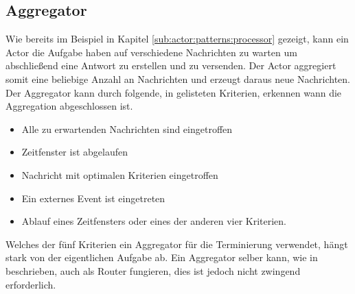\subsection{Aggregator}\label{sec:actor:patterns:aggregator}
Wie bereits im Beispiel in Kapitel \ref{sub:actor:patterns:processor} gezeigt, kann ein Actor die Aufgabe haben auf verschiedene Nachrichten zu warten um abschließend eine Antwort zu erstellen und zu versenden. Der Actor aggregiert somit eine beliebige Anzahl an Nachrichten und erzeugt daraus neue Nachrichten. \\
Der Aggregator kann durch folgende, in \cite{Vernon2015ReactiveAkka} gelisteten Kriterien, erkennen wann die Aggregation abgeschlossen ist.
\begin{itemize}
  \item Alle zu erwartenden Nachrichten sind eingetroffen
  \item Zeitfenster ist abgelaufen
  \item Nachricht mit optimalen Kriterien eingetroffen
  \item Ein externes Event ist eingetreten
  \item Ablauf eines Zeitfensters oder eines der anderen vier Kriterien.
\end{itemize}
Welches der fünf Kriterien ein Aggregator für die Terminierung verwendet, hängt stark von der eigentlichen Aufgabe ab. Ein Aggregator selber kann, wie in \cite{Vernon2015ReactiveAkka} beschrieben, auch als Router fungieren, dies ist jedoch nicht zwingend erforderlich.

